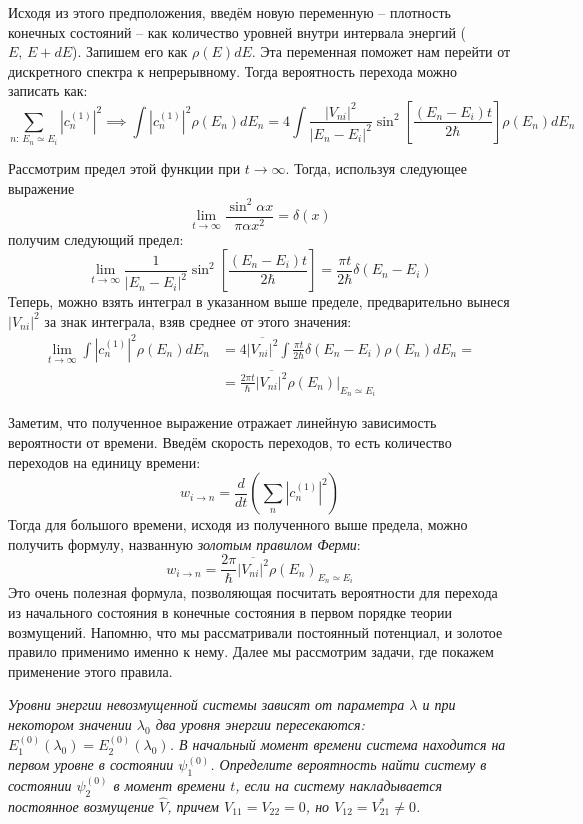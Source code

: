 Исходя из этого предположения, введём новую переменную – плотность конечных
состояний – как количество уровней внутри интервала энергий ($E,\, E+dE$).
Запишем его как $\rho(E)dE$. Эта переменная поможет нам перейти от дискретного
спектра к непрерывному. Тогда вероятность перехода можно записать как:
\[
  \sum\limits_{n:\,E_n\simeq E_i}|c^{(1)}_{n}|^2 \implies \int|c^{(1)}_n|^2\rho(E_n)dE_n=4\int \frac{|V_{ni}|^2}{|E_n-E_i|^2}\sin^2\left[\frac{(E_n-E_i)t}{2\hbar}\right]\rho(E_n)dE_n
\]

Рассмотрим предел этой функции при $t\rightarrow \infty$. Тогда, используя
следующее выражение
\[
  \lim\limits_{t\rightarrow\infty} \frac{\sin^{2}\alpha x}{\pi \alpha x^2} = \delta(x)
\]
получим следующий предел:
\[
  \lim\limits_{t\rightarrow\infty} \frac{1}{|E_n - E_i|^2} \sin^2\left[\frac{(E_n - E_i)t}{2\hbar}\right] = \frac{\pi t}{2\hbar}\delta(E_n - E_i)
\]
Теперь, можно взять интеграл в указанном выше пределе, предварительно вынеся
$|V_{ni}|^2$ за знак интеграла, взяв среднее от этого значения:
\begin{align*}
  \lim\limits_{t\rightarrow\infty}\int|c^{(1)}_n|^2\rho(E_n)dE_n &= 4\overline{|V_{ni}|^2}\int \frac{\pi t}{2\hbar}\delta(E_n - E_i)\rho(E_n)dE_n=\\
  &= \frac{2\pi t}{\hbar}\overline{|V_{ni}|^2} \rho(E_n)\bigg|_{E_n\simeq E_i}
\end{align*}

Заметим, что полученное выражение отражает линейную зависимость вероятности от
времени. Введём скорость переходов, то есть количество переходов на единицу
времени:
\[
  w_{i\rightarrow n} = \frac{d}{dt}\left(\sum\limits_{n}|c^{(1)}_n|^2\right)
\]
Тогда для большого времени, исходя из полученного выше предела, можно получить
формулу, названную \textit{золотым правилом Ферми}:
\[
  w_{i\rightarrow n} = \frac{2\pi}{\hbar}\overline{|V_{ni}|^2} \rho(E_n)_{E_n\simeq E_i}
\]
Это очень полезная формула, позволяющая посчитать вероятности для перехода из
начального состояния в конечные состояния в первом порядке теории возмущений.
Напомню, что мы рассматривали постоянный потенциал, и золотое правило применимо
именно к нему. Далее мы рассмотрим задачи, где покажем применение этого
правила.
\begin{exercise}
  \textit{Уровни энергии невозмущенной системы зависят от параметра $\lambda$ и
    при некотором значении $\lambda_0$ два уровня энергии пересекаются:
    $E_1^{(0)}(\lambda_0)=E_2^{(0)}(\lambda_0)$. В начальный момент времени система
    находится на первом уровне в состоянии $\psi_1^{(0)}$. Определите вероятность
    найти систему в состоянии $\psi_2^{(0)}$ в момент времени $t$, если на систему
    накладывается постоянное возмущение $\hat{V}$, причем $V_{11} = V_{22} = 0$, но
    $V_{12} = V^{\ast}_{21} \neq 0$.}
\end{exercise}

